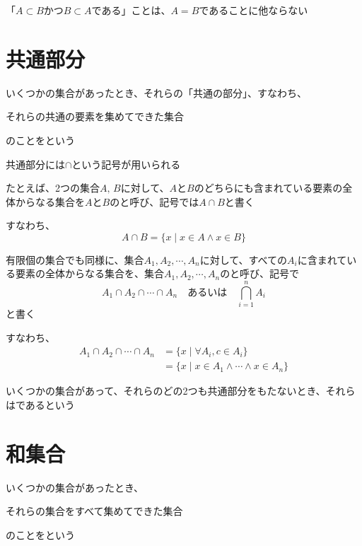 \documentclass[b5paper,12pt]{jsarticle}
\begin{document}
\br

「$A \subset B$かつ$B \subset A$である」ことは、$A = B$であることに他ならない

\sectionline
\section{共通部分}

いくつかの集合があったとき、それらの「共通の部分」、すなわち、
\begin{shaded}
  それらの共通の要素を集めてできた集合
\end{shaded}
のことをという

共通部分には$\cap$という記号が用いられる

\sectionline

たとえば、2つの集合$A,\,B$に対して、$A$と$B$のどちらにも含まれている要素の全体からなる集合を$A$と$B$のと呼び、記号では$A \cap B$と書く

\br

すなわち、
\begin{equation*}
  A \cap B = \{x \mid x \in A \land x \in B\}
\end{equation*}

\sectionline

有限個の集合でも同様に、集合$A_1, A_2, \cdots , A_n$に対して、すべての$A_i$に含まれている要素の全体からなる集合を、集合$A_1, A_2, \cdots , A_n$のと呼び、記号で
\begin{equation*}
  A_1 \cap A_2 \cap \cdots \cap A_n \quad \text{あるいは} \quad \bigcap_{i=1}^n A_i
\end{equation*}
と書く

\br

すなわち、
\begin{align*}
  A_1 \cap A_2 \cap \cdots \cap A_n
   & = \{x \mid \forall A_i , c \in A_i \}               \\
   & = \{x \mid x \in A_1 \land \cdots \land x \in A_n\}
\end{align*}

\sectionline

いくつかの集合があって、それらのどの2つも共通部分をもたないとき、それらはであるという

\sectionline
\section{和集合}

いくつかの集合があったとき、
\begin{shaded}
  それらの集合をすべて集めてできた集合
\end{shaded}
のことをという
\end{document}
